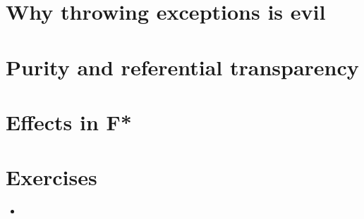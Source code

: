 \documentclass{beamer}
\begin{document}
\section{Why throwing exceptions is evil}

\section{Purity and referential transparency}


\section{Effects in F*}


\section{Exercises}


\begin{frame}{}
\begin{itemize}
	\item 
\end{itemize}
\end{frame}
\end{document}

